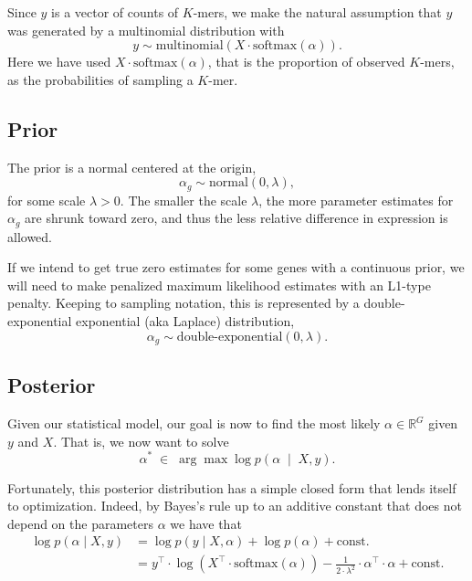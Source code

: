 \documentclass[11pt]{article}
\begin{document}
Since $y$ is a vector of counts of $K$-mers, we make the natural assumption that $y$ was generated 
by a multinomial distribution with
\[
  y \sim \textrm{multinomial}(X \cdot \textrm{softmax}(\alpha)).
\]
Here we have used  $X \cdot \textrm{softmax}(\alpha)$, that is the proportion of observed $K$-mers, as the probabilities of sampling a $K$-mer.

%



\subsection{Prior}

The prior is a normal centered at the origin,
\[
  \alpha_g \sim \textrm{normal}(0, \lambda),
\]
for some scale $\lambda > 0$.  The smaller the scale $\lambda$, the
more parameter estimates for $\alpha_g$ are shrunk toward zero, and
thus the less relative difference in expression is allowed.

If we intend to get true zero estimates for some genes with a
continuous prior, we will need to make penalized maximum likelihood
estimates with an L1-type penalty.  Keeping to sampling notation, this
is represented by a double-exponential exponential (aka Laplace)
distribution,
\[
  \alpha_g \sim \textrm{double-exponential}(0, \lambda).
\]

\subsection{Posterior}

Given our statistical model, our goal is now to find the most likely $\alpha \in \mathbb{R}^{G}$ given $y$ and $X$. That is, we now want to solve
\begin{equation}
\alpha^* \; \in \; \arg \max \log p(\alpha \; \mid \; X,y).
\end{equation}

Fortunately, this posterior distribution has a simple closed form that lends itself to optimization.
 Indeed, by Bayes's rule up to an additive constant
that does not depend on the parameters $\alpha$ we have that
\begin{align}\label{eq:posterior}
  \log p(\alpha \mid X, y)& = \log p(y \mid X, \alpha) + \log p(\alpha) +
  \textrm{const.}  \\
  &= y^{\top} \cdot \log \left( X^{\top} \cdot \textrm{softmax}(\alpha) \right)
          - \frac{1}{2 \cdot \lambda^2} \cdot \alpha^{\top} \cdot \alpha +\textrm{const.} \nonumber
\end{align} 
 
\end{document}
